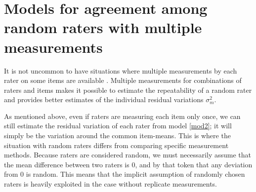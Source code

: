 \documentclass[aoas]{imsart}
\makeatletter
\newcommand{\ie}{\emph{i.e.}\@\xspace}
\makeatother
\begin{document}



\section{Models for agreement among random raters with multiple
  measurements}
\label{sec:replicate}

It is not uncommon to have situations where multiple measurements by
each rater on some items are available \citep{BlanAltm:2007}. Multiple
measurements for combinations of raters and items makes it possible to
estimate the repeatability of a random rater and provides better
estimates of the individual residual variations $\sigma_m^2$.

As mentioned above, even if raters are measuring each item only once,
we can still estimate the residual variation of each rater from model
\eqref{mod2}; it will simply be the variation around the common
item-means. This is where the situation with random raters differs
from comparing specific measurement methods. Because raters are
considered random, we must necessarily assume that the mean difference
between two raters is 0, and by that token that any deviation from 0
is random.  This means that the implicit assumption of randomly chosen
raters is heavily exploited in the case without replicate
measurements.
\end{document}
